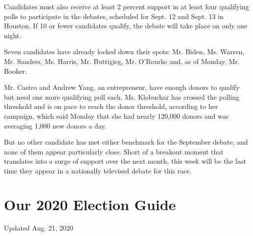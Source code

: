 Candidates must also receive at least 2 percent support in at least four
qualifying polls to participate in the debates, scheduled for Sept. 12
and Sept. 13 in Houston. If 10 or fewer candidates qualify, the debate
will take place on only one night.

Seven candidates have already locked down their spots: Mr. Biden, Ms.
Warren, Mr. Sanders, Ms. Harris, Mr. Buttigieg, Mr. O'Rourke and, as of
Monday, Mr. Booker.

Mr. Castro and Andrew Yang, an entrepreneur, have enough donors to
qualify but need one more qualifying poll each. Ms. Klobuchar has
crossed the polling threshold and is on pace to reach the donor
threshold, according to her campaign, which said Monday that she had
nearly 120,000 donors and was averaging 1,000 new donors a day.

But no other candidate has met either benchmark for the September
debate, and none of them appear particularly close. Short of a breakout
moment that translates into a surge of support over the next month, this
week will be the last time they appear in a nationally televised debate
for this race.

\hypertarget{our-2020-election-guide}{%
\section{Our 2020 Election Guide}\label{our-2020-election-guide}}

Updated Aug. 21, 2020

